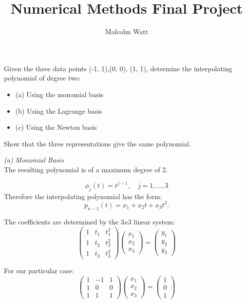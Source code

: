 \documentclass[12pt]{article}
\newenvironment{problem}[2][Problem]{\begin{trivlist}
\item[\hskip \labelsep {\bfseries #1}\hskip \labelsep {\bfseries #2.}]}{\end{trivlist}}
\begin{document}
 
 
\title{Numerical Methods Final Project}
\author{Malcolm Watt}
\maketitle
 
\begin{problem}{7.1}
Given the three data points (-1, 1),(0, 0), (1, 1), determine the interpolating polynomial
of degree two:
\begin{itemize}
    \item (a) Using the monomial basis
\item (b) Using the Lagrange basis
\item (c) Using the Newton basis

\end{itemize}
Show that the three representations give the
same polynomial.

\end{problem}
 
 \textit{(a) Monomial Basis}\\
 The resulting polynomial is of a maximum degree of 2.
 
 $$\phi_j(t)=t^{j-1}, \quad j=1,...,3$$
 Therefore the interpolating polynomial has the form:
 $$p_{n-1}(t) = x_1 + x_2 t + x_3 t^2.$$
 
The coefficients are determined by the $3x3$ linear system:
$$\left(\begin{smallmatrix}
1 & t_1 & t_1^2\\
1 & t_2 & t_2^2\\
1 & t_3 & t_3^2
\end{smallmatrix}\right)
\left(\begin{smallmatrix}
x_1\\x_2\\x_3
\end{smallmatrix}\right)
=\left(\begin{smallmatrix}
y_1\\y_2\\y_3
\end{smallmatrix}\right)$$

For our particular case:
$$\left(\begin{smallmatrix}
1 & -1 & 1\\
1 & 0 & 0\\
1 & 1 & 1
\end{smallmatrix}\right)
\left(\begin{smallmatrix}
x_1\\x_2\\x_3
\end{smallmatrix}\right)
=\left(\begin{smallmatrix}
1\\0\\1
\end{smallmatrix}\right)$$
\end{document}
